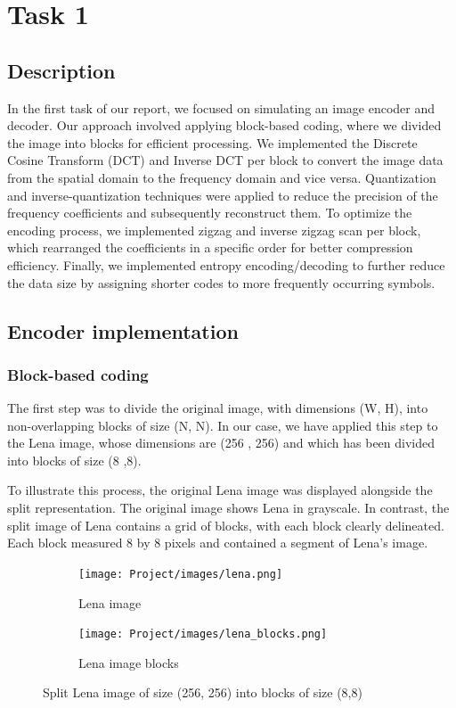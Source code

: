 \documentclass{article}
\begin{document}
\section{Task 1}
\subsection{Description}

In the first task of our report, we focused on simulating an image encoder and decoder. Our approach involved applying block-based coding, where we divided the image into blocks for efficient processing. We implemented the Discrete Cosine Transform (DCT) and Inverse DCT per block to convert the image data from the spatial domain to the frequency domain and vice versa. Quantization and inverse-quantization techniques were applied to reduce the precision of the frequency coefficients and subsequently reconstruct them. To optimize the encoding process, we implemented zigzag and inverse zigzag scan per block, which rearranged the coefficients in a specific order for better compression efficiency. Finally, we implemented entropy encoding/decoding to further reduce the data size by assigning shorter codes to more frequently occurring symbols.

\subsection{Encoder implementation}
\subsubsection{Block-based coding}

The first step was to divide the original image, with dimensions (W, H), into non-overlapping blocks of size (N, N). In our case, we have applied this step to the Lena image, whose dimensions are (256 , 256) and which has been divided into blocks of size (8 ,8).

To illustrate this process, the original Lena image was displayed alongside the split representation. The original image shows Lena in grayscale. In contrast, the split image of Lena contains a grid of blocks, with each block clearly delineated. Each block measured 8 by 8 pixels and contained a segment of Lena's image.

\begin{figure}[H]
  \centering
  \begin{subfigure}[b]{0.45\textwidth}
    \centering
    \texttt{[image: Project/images/lena.png]}
    \caption{Lena image}
    \label{fig:image1}
  \end{subfigure}
  \hfill
  \begin{subfigure}[b]{0.45\textwidth}
    \centering
    \texttt{[image: Project/images/lena\_blocks.png]}
    \caption{Lena image blocks}
    \label{fig:image2}
  \end{subfigure}
  \caption{Split Lena image of size (256, 256) into blocks of size (8,8)}
  \label{fig:overall}
\end{figure}
\end{document}
